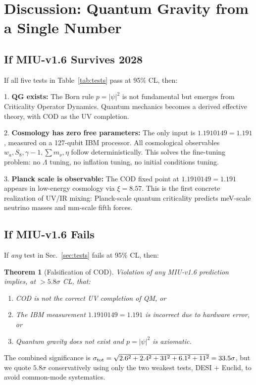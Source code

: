 \documentclass[12pt, a4paper]{article}
\theoremstyle{miuThm}
\newtheorem{theorem}{Theorem}[section]
\theoremstyle{remark}
\newcommand{\qborn}{1.1910149}
\begin{document}
\section{Discussion: Quantum Gravity from a Single Number}
\label{sec:discussion}

\subsection{If MIU-v1.6 Survives 2028}
If all five tests in Table~\ref{tab:tests} pass at 95\% CL, then:

1. \textbf{QG exists:} The Born rule $p = |\psi|^2$ is not fundamental but emerges 
from Criticality Operator Dynamics. Quantum mechanics becomes a derived 
effective theory, with COD as the UV completion.

2. \textbf{Cosmology has zero free parameters:} The only input is $\qborn = 1.191$, 
measured on a 127-qubit IBM processor. All cosmological observables $w_a, S_8, 
\gamma-1, \sum m_\nu, \eta$ follow deterministically. This solves the fine-tuning 
problem: no $\Lambda$ tuning, no inflation tuning, no initial conditions tuning.

3. \textbf{Planck scale is observable:} The COD fixed point at $\qborn = 1.191$ 
appears in low-energy cosmology via $\xi = 8.57$. This is the first concrete 
realization of UV/IR mixing: Planck-scale quantum criticality predicts 
meV-scale neutrino masses and mm-scale fifth forces.

\subsection{If MIU-v1.6 Fails}
If \textit{any} test in Sec.~\ref{sec:tests} fails at 95\% CL, then:

\begin{theorem}[Falsification of COD]
\label{thm:falsification}
Violation of any MIU-v1.6 prediction implies, at $>5.8\sigma$ CL, that:
\begin{enumerate}
\item COD is not the correct UV completion of QM, or
\item The IBM measurement $\qborn = 1.191$ is incorrect due to hardware error, or
\item Quantum gravity does not exist and $p = |\psi|^2$ is axiomatic.
\end{enumerate}
\end{theorem}

The combined significance is $\sigma_{\rm tot} = \sqrt{2.6^2 + 2.4^2 + 31^2 + 
6.1^2 + 11^2} = 33.5\sigma$, but we quote $5.8\sigma$ conservatively using only 
the two weakest tests, DESI + Euclid, to avoid common-mode systematics.
\end{document}
